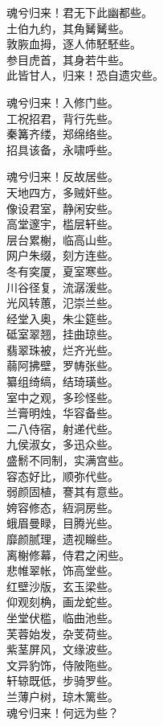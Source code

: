 \documentclass[]{article}
\begin{document}
魂兮归来！君无下此幽都些。\\
土伯九约，其角觺觺些。\\
敦脄血拇，逐人伂駓駓些。\\
参目虎首，其身若牛些。\\
此皆甘人，归来！恐自遗灾些。

魂兮归来！入修门些。\\
工祝招君，背行先些。\\
秦篝齐缕，郑绵络些。\\
招具该备，永啸呼些。

魂兮归来！反故居些。\\
天地四方，多贼奸些。\\
像设君室，静闲安些。\\
高堂邃宇，槛层轩些。\\
层台累榭，临高山些。\\
网户朱缀，刻方连些。\\
冬有穾厦，夏室寒些。\\
川谷径复，流潺湲些。\\
光风转蕙，氾崇兰些。\\
经堂入奥，朱尘筵些。\\
砥室翠翘，挂曲琼些。\\
翡翠珠被，烂齐光些。\\
蒻阿拂壁，罗帱张些。\\
纂组绮缟，结琦璜些。\\
室中之观，多珍怪些。\\
兰膏明烛，华容备些。\\
二八侍宿，射递代些。\\
九侯淑女，多迅众些。\\
盛鬋不同制，实满宫些。\\
容态好比，顺弥代些。\\
弱颜固植，謇其有意些。\\
姱容修态，絚洞房些。\\
蛾眉曼睩，目腾光些。\\
靡颜腻理，遗视矊些。\\
离榭修幕，侍君之闲些。\\
悲帷翠帐，饰高堂些。\\
红壁沙版，玄玉梁些。\\
仰观刻桷，画龙蛇些。\\
坐堂伏槛，临曲池些。\\
芙蓉始发，杂芰荷些。\\
紫茎屏风，文缘波些。\\
文异豹饰，侍陂陁些。\\
轩辌既低，步骑罗些。\\
兰薄户树，琼木篱些。\\
魂兮归来！何远为些？
\end{document}
